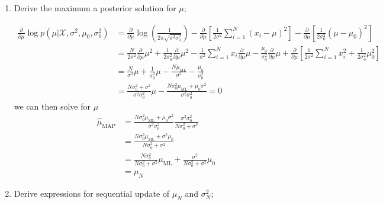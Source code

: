 \documentclass{amsmlaj}
\begin{document}
\begin{problem}
\begin{enumerate}
\item Derive the maximum a posterior solution for $\mu$;

	\begin{equation}
		\begin{split}
						\frac{\partial}{\partial\mu}\log p(\mu|\mathcal{X},\sigma^2,\mu_0,\sigma_0^2)
						&=\frac{\partial}{\partial\mu}\log\left(\frac{1}{2\pi\sqrt{\sigma^2\sigma_0^2}}\right)
						-\frac{\partial}{\partial\mu}\left[\frac{1}{2\sigma^2}\sum_{i=1}^N(x_i-\mu)^2
						\right]-\frac{\partial}{\partial\mu}\left[
										\frac{1}{2\sigma_0^2}(\mu-\mu_0)^2
						\right] \\
						&=\frac{N}{2\sigma^2}\frac{\partial}{\partial\mu}\mu^2+
						\frac{1}{2\sigma_0^2}\frac{\partial}{\partial\mu}\mu^2-
						\frac{1}{\sigma^2}\sum_{i=1}^N x_i\frac{\partial}{\partial\mu}\mu-
						\frac{\mu_0}{\sigma_0^2}\frac{\partial}{\partial\mu}\mu+
						\frac{\partial}{\partial\mu}\left[ 
										\frac{1}{2\sigma^2}\sum_{i=1}^N x_i^2 +
										\frac{1}{2\sigma_0^2}\mu_0^2
						\right] \\
						&=\frac{N}{\sigma^2}\mu +
						\frac{1}{\sigma_0^2}\mu -
						\frac{N\mu_\text{ML}}{\sigma^2} -
						\frac{\mu_0}{\sigma_0^2} \\
						&=
						\frac{N\sigma_0^2+\sigma^2}{\sigma^2\sigma_0^2}\mu -
						\frac{N\sigma_0^2\mu_\text{ML}+\mu_0\sigma^2}{\sigma^2\sigma_0^2}=0
		\end{split}
	\end{equation}
	we can then solve for $\mu$
	\begin{equation}
		\begin{split}
					\hat{\mu}_\text{MAP}&=
						\frac{N\sigma_0^2\mu_\text{ML}+\mu_0\sigma^2}{\sigma^2\sigma_0^2}
						\frac{\sigma^2\sigma_0^2}{N\sigma_0^2+\sigma^2} \\
						&=\frac{N\sigma_0^2\mu_\text{ML}+\sigma^2\mu_0}{N\sigma_0^2+\sigma^2} \\
						&=\frac{N\sigma_0^2}{N\sigma_0^2+\sigma^2}\mu_\text{ML}
						+\frac{\sigma^2}{N\sigma_0^2+\sigma^2}\mu_0 \\
						&=\mu_N
		\end{split}
	\end{equation}

\item Derive expressions for sequential update of $\mu_N$ and
				$\sigma_N^2$;


\end{enumerate}
\end{problem}
\end{document}
